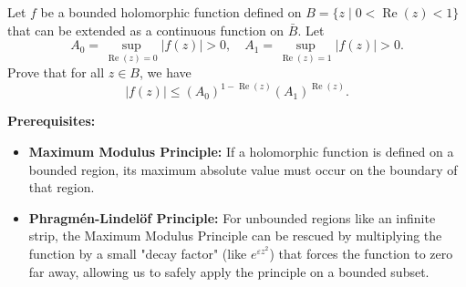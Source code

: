 \begin{exercise}
\label{analysis:2021:5}
Let $f$ be a bounded holomorphic function defined on $B=\{z\mid 0<\operatorname{Re}(z)<1\}$ that can be extended as a continuous function on $\bar{B}$. Let
\[
A_0 = \sup_{\operatorname{Re}(z)=0}|f(z)| > 0,\quad A_1 = \sup_{\operatorname{Re}(z)=1}|f(z)| > 0.
\]
Prove that for all $z\in B$, we have
\[
|f(z)| \leq (A_0)^{1-\operatorname{Re}(z)}(A_1)^{\operatorname{Re}(z)}.
\]
\end{exercise}

\begin{solution}
\textbf{Prerequisites:}
\begin{itemize}
    \item \textbf{Maximum Modulus Principle:} If a holomorphic function is defined on a bounded region, its maximum absolute value must occur on the boundary of that region.
    \item \textbf{Phragmén-Lindelöf Principle:} For unbounded regions like an infinite strip, the Maximum Modulus Principle can be rescued by multiplying the function by a small "decay factor" (like $e^{\varepsilon z^2}$) that forces the function to zero far away, allowing us to safely apply the principle on a bounded subset.
\end{itemize}


\end{solution}
